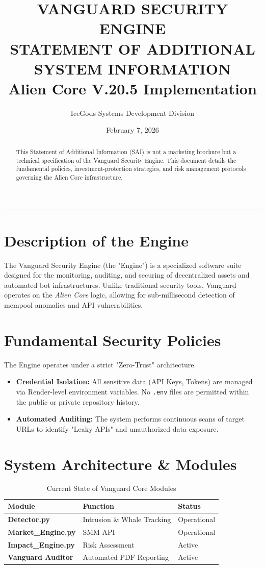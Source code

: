 \documentclass[11pt, a4paper]{article}
\title{
    \textbf{VANGUARD SECURITY ENGINE} \\
    \large STATEMENT OF ADDITIONAL SYSTEM INFORMATION \\
    \small Alien Core V.20.5 Implementation
}
\author{IceGods Systems Development Division}
\date{February 7, 2026}
\begin{document}
\maketitle

\begin{abstract}
This Statement of Additional Information (SAI) is not a marketing brochure but a technical specification of the Vanguard Security Engine. This document details the fundamental policies, investment-protection strategies, and risk management protocols governing the Alien Core infrastructure.
\end{abstract}

\hrule
\vspace{0.5cm}

\section{Description of the Engine}
The Vanguard Security Engine (the "Engine") is a specialized software suite designed for the monitoring, auditing, and securing of decentralized assets and automated bot infrastructures. Unlike traditional security tools, Vanguard operates on the \textit{Alien Core} logic, allowing for sub-millisecond detection of mempool anomalies and API vulnerabilities.

\section{Fundamental Security Policies}
The Engine operates under a strict "Zero-Trust" architecture.
\begin{itemize}
    \item \textbf{Credential Isolation:} All sensitive data (API Keys, Tokens) are managed via Render-level environment variables. No \texttt{.env} files are permitted within the public or private repository history.
    \item \textbf{Automated Auditing:} The system performs continuous scans of target URLs to identify "Leaky APIs" and unauthorized data exposure.
\end{itemize}

\section{System Architecture \& Modules}
\begin{table}[htbp]
  \centering
  \begin{tabular}{@{}lll@{}}
    \toprule
    Module & Function & Status \\
    \midrule
    \textbf{Detector.py} & Intrusion \& Whale Tracking & Operational \\
    \textbf{Market\_Engine.py} & SMM API & Operational \\
    \textbf{Impact\_Engine.py} & Risk Assessment & Active \\
    \textbf{Vanguard Auditor} & Automated PDF Reporting & Active \\
    \bottomrule
  \end{tabular}
  \caption{Current State of Vanguard Core Modules}
\end{table}
\end{document}
